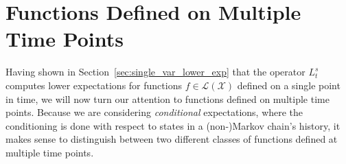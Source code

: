 \documentclass[10pt]{paper}
\theoremstyle{definition}
\newcommand{\states}{\mathcal{X}}
\newcommand{\processes}{\mathbb{P}}
\newcommand{\wprocesses}{\processes^{\mathrm{W}}}
\newcommand{\gambles}{\mathcal{L}}
\newcommand{\gamblesX}{\gambles(\states)}
\newcommand{\rateset}{\mathcal{Q}}
\newcommand{\lrate}{\underline{Q}}
\newcommand{\coloneqq}{:\!=}
\begin{document}
%
%
%

\section{Functions Defined on Multiple Time Points}\label{sec:funcs_multi_time_points}

Having shown in Section~\ref{sec:single_var_lower_exp} that the operator $L_t^s$ computes lower expectations for functions $f\in\gamblesX$ defined on a single point in time, we will now turn our attention to functions defined on multiple time points. Because we are considering \emph{conditional} expectations, where the conditioning is done with respect to states in a (non-)Markov chain's history, it makes sense to distinguish between two different classes of functions defined at multiple time points. 
\end{document}
